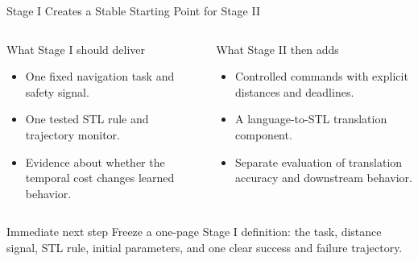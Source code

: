 \documentclass[aspectratio=169]{beamer}
\begin{document}
\begin{frame}{Stage I Creates a Stable Starting Point for Stage II}
\begin{columns}[T]
\begin{block}{What Stage I should deliver}
\footnotesize
\begin{itemize}
  \item One fixed navigation task and safety signal.
  \item One tested STL rule and trajectory monitor.
  \item Evidence about whether the temporal cost changes learned behavior.
\end{itemize}
\end{block}

\begin{block}{What Stage II then adds}
\footnotesize
\begin{itemize}
  \item Controlled commands with explicit distances and deadlines.
  \item A language-to-STL translation component.
  \item Separate evaluation of translation accuracy and downstream behavior.
\end{itemize}
\end{block}
\end{columns}

\begin{block}{Immediate next step}
\large
Freeze a one-page Stage I definition: the task, distance signal, STL rule, initial parameters, and one clear success and failure trajectory.
\end{block}
\end{frame}
\end{document}
